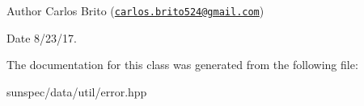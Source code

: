 \begin{DoxyAuthor}{Author}
Carlos Brito (\href{mailto:carlos.brito524@gmail.com}{\tt carlos.\+brito524@gmail.\+com}) 
\end{DoxyAuthor}
\begin{DoxyDate}{Date}
8/23/17. 
\end{DoxyDate}


The documentation for this class was generated from the following file\+:\begin{DoxyCompactItemize}
\item 
sunspec/data/util/error.\+hpp\end{DoxyCompactItemize}
